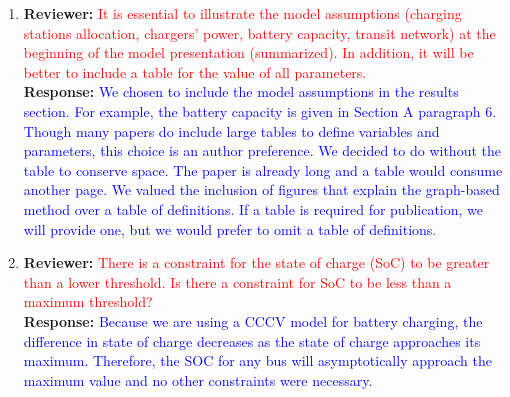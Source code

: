 \documentclass{article}
\newcommand\formatfeedback[2]
{%
	\textbf{Reviewer:} \textcolor{red}{#1} 
	\leavevmode\\[0.1in] \textbf{Response:} \textcolor{blue}{#2}
}
\begin{document}
\begin{enumerate}
{Including charge demand, electricity ToU tariff, and day/night charging are not new.}{We understand this comment to contain two concerns: The proposed work does not include an adequate comparison with previous models, and the proposed work claims the addition of ToU tariffs and day/night charging as novel contributions when this has been done before. To address the first concern, our paper includes a comparison in Fig. 17 with both a baseline charging method, which models the behavior of drivers at the Utah Transit Authority in Salt Lake City, and a previously published method from the literature.  Additional comparisons and analysis appear in Fig. 18 and Fig. 19. We felt that this level of comparison was adequate to evaluate the proposed method. To address the second concern, we agree that the inclusion of day/night charging and time of use tariff is not novel. What we propose to be novel is how we included day/night charging, time of use tariffs, uncontrolled loads, and variable rate charging together in a single optimization problem (See Section IC).  This combination of features does not appear in previously published work and the inclusion of uncontrolled loads and variable rate charging are new.} 
\item \formatfeedback{It is essential to illustrate the model assumptions (charging stations allocation, chargers’ power,
battery capacity, transit network) at the beginning of the model presentation (summarized). In
addition, it will be better to include a table for the value of all parameters.}{We chosen to include the model assumptions in the results section. For example, the battery capacity is given in Section A paragraph 6. Though many papers do include large tables to define variables and parameters, this choice is an author preference.  We decided to do without the table to conserve space.  The paper is already long and a table would consume another page.  We valued the inclusion of figures that explain the graph-based method over a table of definitions. If a table is required for publication, we will provide one, but we would prefer to omit a table of definitions.}
	\item \formatfeedback{There is a constraint for the state of charge (SoC) to be greater than a lower threshold. Is there a
constraint for SoC to be less than a maximum threshold?}{Because we are using a CCCV model for battery charging, the difference in state of charge decreases as the state of charge approaches its maximum. Therefore, the SOC for any bus will asymptotically approach the maximum value and no other constraints were necessary.}

\end{enumerate}
\end{document}
